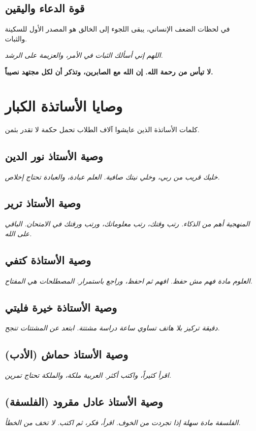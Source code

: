 \documentclass[12pt,a4paper]{book}
\newcommand{\quoteAr}[1]{%
	\begin{myquote}
		\itshape #1
	\end{myquote}
}
\newcommand{\importantAr}[1]{%
	\begin{important}
		\bfseries #1
	\end{important}
}
\begin{document}
	\subsection{قوة الدعاء واليقين}
	في لحظات الضعف الإنساني، يبقى اللجوء إلى الخالق هو المصدر الأول للسكينة والثبات.
	
	\quoteAr{اللهم إني أسألك الثبات في الأمر، والعزيمة على الرشد.}
	
	\importantAr{لا تيأس من رحمة الله. إن الله مع الصابرين، وتذكر أن لكل مجتهد نصيباً.}
	
	
	
	
	
	\section{وصايا الأساتذة الكبار}
	
	كلمات الأساتذة الذين عايشوا آلاف الطلاب تحمل حكمة لا تقدر بثمن.
	
	\subsection{وصية الأستاذ نور الدين}
	\quoteAr{خليك قريب من ربي، وخلي نيتك صافية. العلم عبادة، والعبادة تحتاج إخلاص.}
	
	\subsection{وصية الأستاذ ترير}
	\quoteAr{المنهجية أهم من الذكاء. رتب وقتك، رتب معلوماتك، ورتب ورقتك في الامتحان. الباقي على الله.}
	
	\subsection{وصية الأستاذة كتفي}
	\quoteAr{العلوم مادة فهم مش حفظ. افهم ثم احفظ، وراجع باستمرار. المصطلحات هي المفتاح.}
	
	\subsection{وصية الأستاذة خيرة فليتي}
	\quoteAr{دقيقة تركيز بلا هاتف تساوي ساعة دراسة مشتتة. ابتعد عن المشتتات تنجح.}
	
	\subsection{وصية الأستاذ حماش (الأدب)}
	\quoteAr{اقرأ كثيراً، واكتب أكثر. العربية ملكة، والملكة تحتاج تمرين.}
	
	\subsection{وصية الأستاذ عادل مقرود (الفلسفة)}
	\quoteAr{الفلسفة مادة سهلة إذا تجردت من الخوف. اقرأ، فكر، ثم اكتب. لا تخف من الخطأ.}
	
\end{document}
